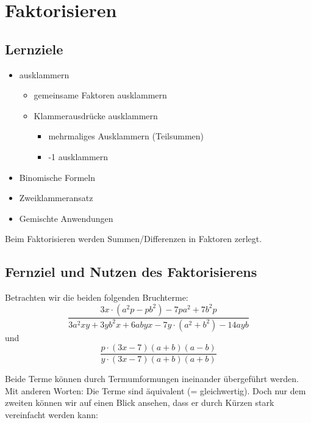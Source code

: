 \newpage
\section{Faktorisieren}

\subsection*{Lernziele}

\begin{itemize}
\item ausklammern
 \begin{itemize}
  \item gemeinsame Faktoren ausklammern
  \item Klammerausdrücke ausklammern
   \begin{itemize}
   \item mehrmaliges Ausklammern (Teilsummen)
  \item -1 ausklammern
  \end{itemize}
\end{itemize}
\item Binomische Formeln
\item Zweiklammeransatz
\item Gemischte Anwendungen
\end{itemize}


\newpage


Beim Faktorisieren werden Summen/Differenzen in Faktoren
zerlegt.


\subsection*{Fernziel und Nutzen des Faktorisierens}
Betrachten wir die beiden folgenden Bruchterme:
 $$\frac{3x\cdot{}(a^2p - pb^2) - 7pa^2 + 7b^2p}{3a^2xy  + 3yb^2x + 6abyx - 7y\cdot{}(a^2 +b^2) - 14ayb }$$
und
$$\frac{p\cdot{}(3x-7)(a+b)(a-b)}{y\cdot{}(3x-7)(a+b)(a+b)}$$

Beide Terme können durch Termumformungen ineinander übergeführt
werden. Mit anderen Worten: Die Terme sind äquivalent (= gleichwertig). Doch nur dem zweiten können wir auf einen Blick ansehen, dass er durch Kürzen stark vereinfacht werden kann:

